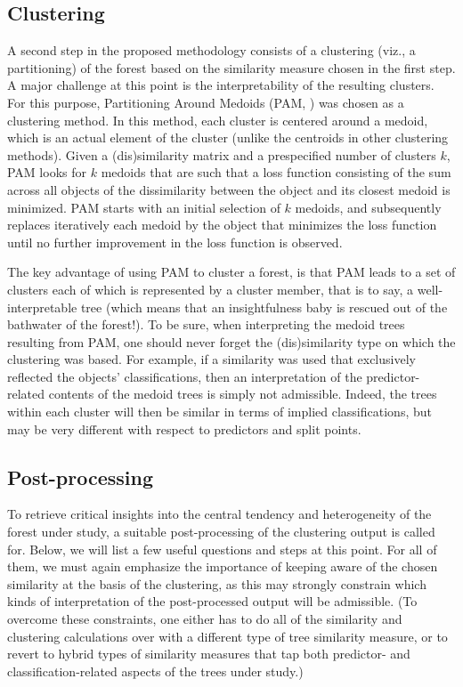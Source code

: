 \subsection{Clustering}
A second step in the proposed methodology consists of a clustering (viz., a partitioning) of the forest based on the similarity measure chosen in the first step. A major challenge at this point is the interpretability of the resulting clusters. For this purpose, Partitioning Around Medoids (PAM, \citet{Kaufman2009}) was chosen as a clustering method. In this method, each cluster is centered around a medoid, which is an actual element of the cluster (unlike the centroids in other clustering methods). Given a (dis)similarity matrix and a prespecified number of clusters $k$, PAM looks for $k$ medoids that are such that a loss function consisting of the sum across all objects of the dissimilarity between the object and its closest medoid is minimized. PAM starts with an initial selection of $k$ medoids, and subsequently replaces iteratively each medoid by the object that minimizes the loss function until no further improvement in the loss function is observed.

The key advantage of using PAM to cluster a forest, is that PAM leads to a set of clusters each of which is represented by a cluster member, that is to say, a well-interpretable tree (which means that an insightfulness baby is rescued out of the bathwater of the forest!). To be sure, when interpreting the medoid trees resulting from PAM, one should never forget the (dis)similarity type on which the clustering was based. For example, if a similarity was used that exclusively reflected the objects' classifications, then an interpretation of the predictor-related contents of the medoid trees is simply not admissible. Indeed, the trees within each cluster will then be similar in terms of implied classifications, but may be very different with respect to predictors and split points.



\subsection{Post-processing}
To retrieve critical insights into the central tendency and heterogeneity of the forest under study, a suitable post-processing of the clustering output is called for. Below, we will list a few useful questions and steps at this point. For all of them, we must again emphasize the importance of keeping aware of the chosen similarity at the basis of the clustering, as this may strongly constrain which kinds of interpretation of the post-processed output will be admissible. (To overcome these constraints, one either has to do all of the similarity and clustering calculations over with a different type of tree similarity measure, or to revert to hybrid types of similarity measures that tap both predictor- and classification-related aspects of the trees under study.)

